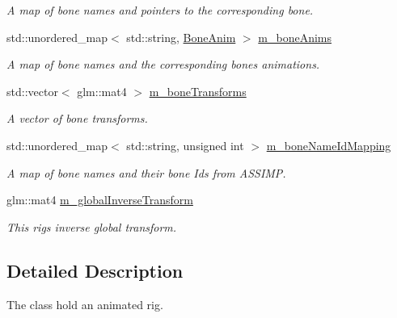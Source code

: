 \begin{DoxyCompactItemize}
\begin{DoxyCompactList}\small\item\em A map of bone names and pointers to the corresponding bone. \end{DoxyCompactList}\item 
std\+::unordered\+\_\+map$<$ std\+::string, \hyperlink{structBoneAnim}{Bone\+Anim} $>$ \hyperlink{classRig_a909d3789ddcfa23ee5fd2f500bfa315d}{m\+\_\+bone\+Anims}\hypertarget{classRig_a909d3789ddcfa23ee5fd2f500bfa315d}{}\label{classRig_a909d3789ddcfa23ee5fd2f500bfa315d}

\begin{DoxyCompactList}\small\item\em A map of bone names and the corresponding bones animations. \end{DoxyCompactList}\item 
std\+::vector$<$ glm\+::mat4 $>$ \hyperlink{classRig_a7ec3cb81dbcbecde100a56c89e07cf6b}{m\+\_\+bone\+Transforms}\hypertarget{classRig_a7ec3cb81dbcbecde100a56c89e07cf6b}{}\label{classRig_a7ec3cb81dbcbecde100a56c89e07cf6b}

\begin{DoxyCompactList}\small\item\em A vector of bone transforms. \end{DoxyCompactList}\item 
std\+::unordered\+\_\+map$<$ std\+::string, unsigned int $>$ \hyperlink{classRig_aa35d3e63ffb0f51931cc846c040ccc7b}{m\+\_\+bone\+Name\+Id\+Mapping}\hypertarget{classRig_aa35d3e63ffb0f51931cc846c040ccc7b}{}\label{classRig_aa35d3e63ffb0f51931cc846c040ccc7b}

\begin{DoxyCompactList}\small\item\em A map of bone names and their bone Ids from A\+S\+S\+I\+MP. \end{DoxyCompactList}\item 
glm\+::mat4 \hyperlink{classRig_aae508831344e13ec86fdb10081d87130}{m\+\_\+global\+Inverse\+Transform}\hypertarget{classRig_aae508831344e13ec86fdb10081d87130}{}\label{classRig_aae508831344e13ec86fdb10081d87130}

\begin{DoxyCompactList}\small\item\em This rigs inverse global transform. \end{DoxyCompactList}\end{DoxyCompactItemize}


\subsection{Detailed Description}
The class hold an animated rig. 

